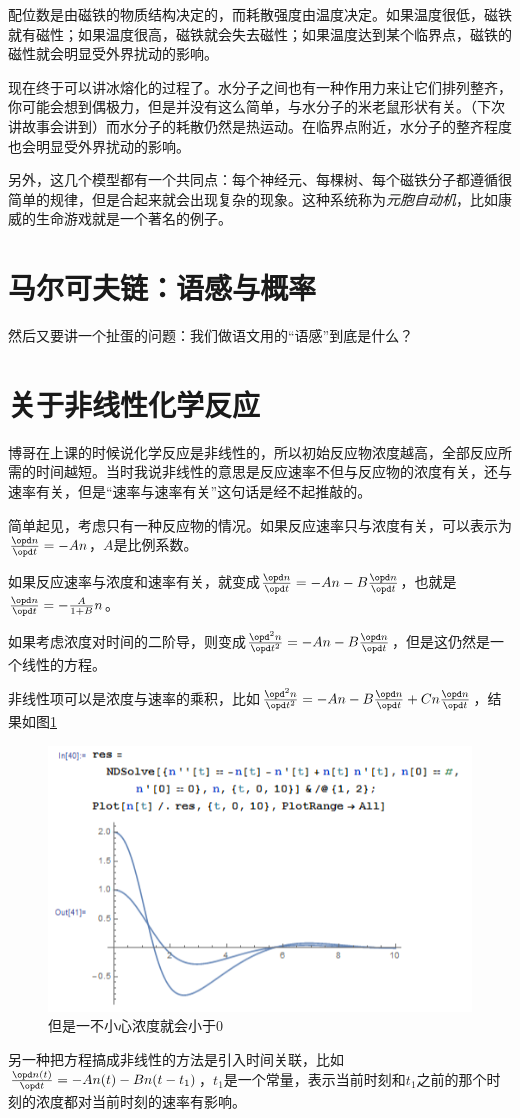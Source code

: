 配位数是由磁铁的物质结构决定的，而耗散强度由温度决定。如果温度很低，磁铁就有磁性；如果温度很高，磁铁就会失去磁性；如果温度达到某个临界点，磁铁的磁性就会明显受外界扰动的影响。

现在终于可以讲冰熔化的过程了。水分子之间也有一种作用力来让它们排列整齐，你可能会想到偶极力，但是并没有这么简单，与水分子的米老鼠形状有关。（下次讲故事会讲到）而水分子的耗散仍然是热运动。在临界点附近，水分子的整齐程度也会明显受外界扰动的影响。

另外，这几个模型都有一个共同点：每个神经元、每棵树、每个磁铁分子都遵循很简单的规律，但是合起来就会出现复杂的现象。这种系统称为\emph{元胞自动机}，比如康威的生命游戏就是一个著名的例子。
\section{马尔可夫链：语感与概率}
然后又要讲一个扯蛋的问题：我们做语文用的“语感”到底是什么？
\section{关于非线性化学反应}
博哥在上课的时候说化学反应是非线性的，所以初始反应物浓度越高，全部反应所需的时间越短。当时我说非线性的意思是反应速率不但与反应物的浓度有关，还与速率有关，但是“速率与速率有关”这句话是经不起推敲的。

简单起见，考虑只有一种反应物的情况。如果反应速率只与浓度有关，可以表示为$\frac{\opd n}{\opd t}=-A n$，$A$是比例系数。

如果反应速率与浓度和速率有关，就变成$\frac{\opd n}{\opd t}=-A n-B \frac{\opd n}{\opd t}$，也就是$\frac{\opd n}{\opd t}=-\frac{A}{1+B} n$。

如果考虑浓度对时间的二阶导，则变成$\frac{\opd^2 n}{\opd t^2}=-A n-B \frac{\opd n}{\opd t}$，但是这仍然是一个线性的方程。

非线性项可以是浓度与速率的乘积，比如$\frac{\opd^2 n}{\opd t^2}=-A n-B \frac{\opd n}{\opd t}+C n \frac{\opd n}{\opd t}$，结果如图\ref{fig-nonlinear-reaction}
\begin{figure}[htb]
\centering
\includegraphics[scale=0.5]{fig/nonlinear-reaction}
\caption{但是一不小心浓度就会小于0}
\label{fig-nonlinear-reaction}
\end{figure}

另一种把方程搞成非线性的方法是引入时间关联，比如$\frac{\opd n(t)}{\opd t}=-A n(t)-B n(t-t_1)$，$t_1$是一个常量，表示当前时刻和$t_1$之前的那个时刻的浓度都对当前时刻的速率有影响。
